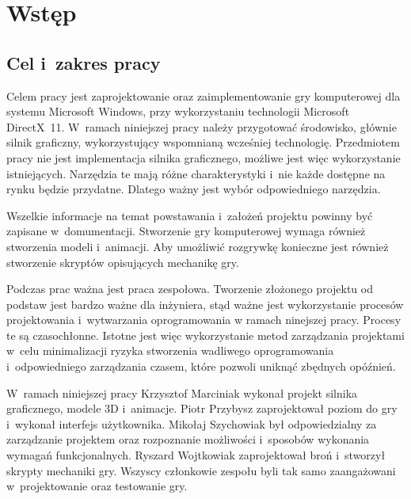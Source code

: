 
\chapter{Wst\k{e}p}

\section{Cel i~zakres pracy}

Celem pracy jest zaprojektowanie oraz zaimplementowanie gry komputerowej dla systemu Microsoft Windows, przy wykorzystaniu technologii Microsoft DirectX~11. W~ramach niniejszej pracy należy przygotować środowisko, głównie silnik graficzny, wykorzystujący wspomnianą wcześniej technologię. Przedmiotem pracy nie jest implementacja silnika graficznego, możliwe jest więc wykorzystanie istniejących. Narzędzia te mają różne charakterystyki i~nie każde dostępne na rynku będzie przydatne. Dlatego ważny jest wybór odpowiedniego narzędzia. 

Wszelkie informacje na temat  powstawania i~założeń projektu powinny być zapisane w~domumentacji. Stworzenie gry komputerowej wymaga również stworzenia modeli i~animacji. Aby umożliwić rozgrywkę konieczne jest również stworzenie skryptów opisujących mechanikę gry.  

Podczas prac ważna jest praca zespołowa. Tworzenie złożonego projektu od podstaw jest bardzo ważne dla inżyniera, stąd ważne jest wykorzystanie procesów projektowania i~wytwarzania oprogramowania w ramach ninejszej pracy. Procesy te są czasochłonne. Istotne jest więc wykorzystanie metod zarządzania projektami w~celu minimalizacji ryzyka stworzenia wadliwego oprogramowania i~odpowiedniego zarządzania czasem, które pozwoli uniknąć zbędnych opóźnień. 

W~ramach niniejszej pracy Krzysztof Marciniak wykonał projekt silnika graficznego, modele 3D i~animacje. 
Piotr Przybysz zaprojektował poziom do gry i~wykonał interfejs użytkownika. 
Mikołaj Szychowiak był odpowiedzialny za zarządzanie projektem oraz rozpoznanie możliwości i~sposobów wykonania wymagań funkcjonalnych.
Ryszard Wojtkowiak zaprojektował broń i~stworzył skrypty mechaniki gry.
Wszyscy członkowie zespołu byli tak samo zaangażowani w~projektowanie oraz testowanie gry.